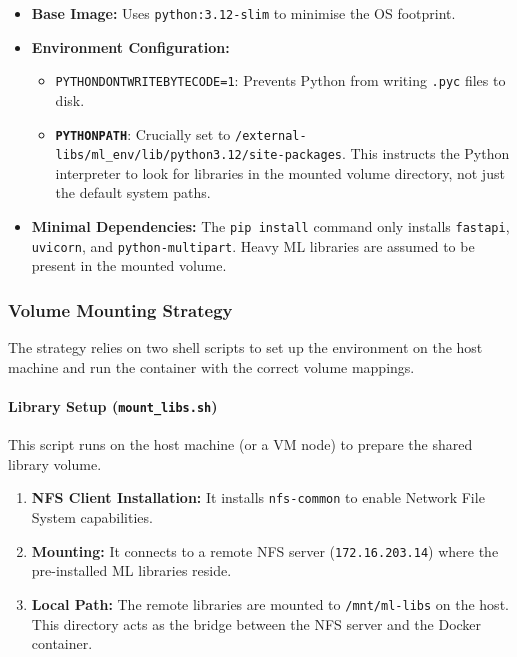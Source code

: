 \documentclass[10pt,a4paper,twocolumn]{article}
\begin{document}
\begin{itemize}
    \item \textbf{Base Image:} Uses \texttt{python:3.12-slim} to minimise the OS footprint.
    \item \textbf{Environment Configuration:} 
    \begin{itemize}
        \item \texttt{PYTHONDONTWRITEBYTECODE=1}: Prevents Python from writing \texttt{.pyc} files to disk.
        \item \textbf{\texttt{PYTHONPATH}}: Crucially set to \texttt{/external-libs/ml\_env/lib/python3.12/site-packages}. This instructs the Python interpreter to look for libraries in the mounted volume directory, not just the default system paths.
    \end{itemize}
    \item \textbf{Minimal Dependencies:} The \texttt{pip install} command only installs \texttt{fastapi}, \texttt{uvicorn}, and \texttt{python-multipart}. Heavy ML libraries are assumed to be present in the mounted volume.
\end{itemize}

\subsubsection{Volume Mounting Strategy}

The strategy relies on two shell scripts to set up the environment on the host machine and run the container with the correct volume mappings.

\paragraph{Library Setup (\texttt{mount\_libs.sh})}
This script runs on the host machine (or a VM node) to prepare the shared library volume.
\begin{enumerate}
    \item \textbf{NFS Client Installation:} It installs \texttt{nfs-common} to enable Network File System capabilities.
    \item \textbf{Mounting:} It connects to a remote NFS server (\texttt{172.16.203.14}) where the pre-installed ML libraries reside.
    \item \textbf{Local Path:} The remote libraries are mounted to \texttt{/mnt/ml-libs} on the host. This directory acts as the bridge between the NFS server and the Docker container.
\end{enumerate}
\end{document}
